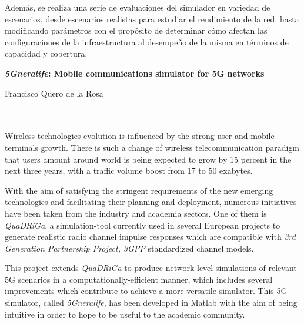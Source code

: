 Además, se realiza una serie de evaluaciones del simulador en variedad de escenarios, desde escenarios realistas para estudiar el rendimiento de la red, hasta modificando parámetros con el propósito de determinar cómo afectan las configuraciones de la infraestructura al desempeño de la misma en términos de capacidad y cobertura.
\cleardoublepage


\thispagestyle{empty}


\begin{center}
{\large\bfseries \textit{5Gneralife}: Mobile communications simulator for 5G networks}\\
\end{center}
\begin{center}
Francisco Quero de la Rosa\\
\end{center}

\\

\vspace{0.7cm}
\\

Wireless technologies evolution is influenced by the strong user and mobile terminals growth. There is such a change of wireless telecommunication paradigm that users amount around world is being expected to grow by 15 percent in the next three years, with a traffic volume boost from 17 to 50 exabytes.

With the aim of satisfying the stringent requirements of the new emerging technologies and facilitating their planning and deployment, numerous initiatives have been taken from the industry and academia sectors. One of them is \textit{QuaDRiGa}, a simulation-tool currently used in several European projects to generate realistic radio channel impulse responses which are compatible with \textit{3rd Generation Partnership Project, 3GPP} standardized channel models. 

This project extends \textit{QuaDRiGa} to produce network-level simulations of relevant 5G scenarios in a computationally-efficient manner, which includes several improvements which contribute to achieve a more versatile simulator. This 5G simulator, called \textit{5Gneralife}, has been developed in Matlab with the aim of being intuitive in order to hope to be useful to the academic community.

